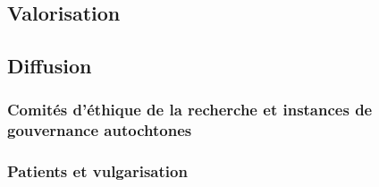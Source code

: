\subsection{Valorisation}
\label{sec:valorisation-modele}

\subsection{Diffusion}
\label{sec:diffusion}

\subsubsection{Comités d'éthique de la recherche et instances de gouvernance autochtones}
\label{sec:diffusion-cer}

\subsubsection{Patients et vulgarisation}
\label{sec:diffusion-patients}
